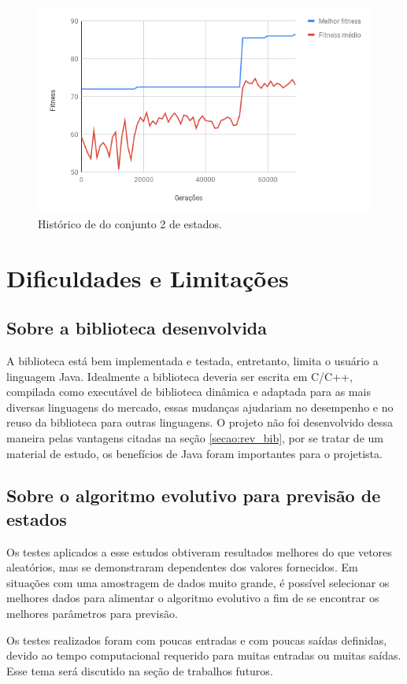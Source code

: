 \begin{figure}[htb]
    \caption{Histórico de \fitness do conjunto 2 de estados.}
    \label{figura:resultado_79}
    \centering
    \includegraphics[scale=0.8]{images/resultado_79}
    \fautor
\end{figure}

\section{Dificuldades e Limitações}

\subsection{Sobre a biblioteca desenvolvida}

A biblioteca está bem implementada e testada, entretanto, limita o usuário a linguagem Java. Idealmente a biblioteca deveria ser escrita em C/C++, compilada como executável de biblioteca dinâmica e adaptada para as mais diversas linguagens do mercado, essas mudanças ajudariam no desempenho e no reuso da biblioteca para outras linguagens. O projeto não foi desenvolvido dessa maneira pelas vantagens citadas na seção \ref{secao:rev_bib}, por se tratar de um material de estudo, os benefícios de Java foram importantes para o projetista.

\subsection{Sobre o algoritmo evolutivo para previsão de estados}

Os testes aplicados a esse estudos obtiveram resultados melhores do que vetores aleatórios, mas se demonstraram dependentes dos valores fornecidos. Em situações com uma amostragem de dados muito grande, é possível selecionar os melhores dados para alimentar o algoritmo evolutivo a fim de se encontrar os melhores parâmetros para previsão.

Os testes realizados foram com poucas entradas e com poucas saídas definidas, devido ao tempo computacional requerido para muitas entradas ou muitas saídas. Esse tema será discutido na seção de trabalhos futuros.
